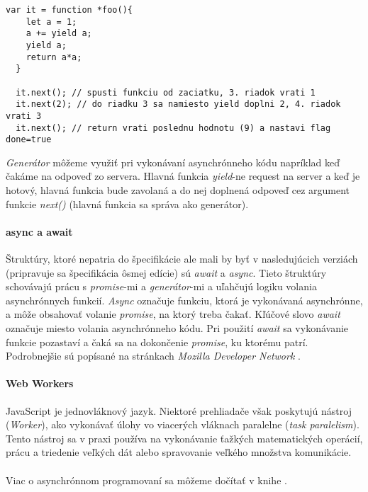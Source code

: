 \begin{lstlisting}[caption=Generátor, label={lst:generator}]
  var it = function *foo(){
    let a = 1;
    a += yield a;
    yield a;
    return a*a;
  }

  it.next(); // spusti funkciu od zaciatku, 3. riadok vrati 1
  it.next(2); // do riadku 3 sa namiesto yield doplni 2, 4. riadok vrati 3
  it.next(); // return vrati poslednu hodnotu (9) a nastavi flag done=true
\end{lstlisting}

\emph{Generátor} môžeme využiť pri vykonávaní asynchrónneho kódu napríklad keď čakáme na odpoveď zo servera. Hlavná funkcia \emph{yield}-ne request na server a keď je hotový, hlavná funkcia bude zavolaná a do nej doplnená odpoveď cez argument funkcie \emph{next()} (hlavná funkcia sa správa ako generátor).

\paragraph{async a await}
Štruktúry, ktoré nepatria do špecifikácie \JS{} ale mali by byť v nasledujúcich verziách (pripravuje sa špecifikácia ôsmej edície) sú \emph{await} a \emph{async}. 
Tieto štruktúry schovávajú prácu s \emph{promise}-mi a \emph{generátor}-mi a uľahčujú logiku volania asynchrónnych funkcií.
\emph{Async} označuje funkciu, ktorá je vykonávaná asynchrónne, a môže obsahovať volanie \emph{promise}, na ktorý treba čakať.
Kľúčové slovo \emph{await} označuje miesto volania asynchrónneho kódu. Pri použití \emph{await} sa vykonávanie funkcie pozastaví a čaká sa na dokončenie \emph{promise}, ku ktorému patrí.
Podrobnejšie sú popísané na stránkach \emph{Mozilla Developer Network} \cite{async, await}.

\paragraph{Web Workers}
JavaScript je jednovláknový jazyk. Niektoré prehliadače však poskytujú nástroj (\emph{Worker}), ako vykonávať úlohy vo viacerých vláknach paralelne (\emph{task paralelism}). Tento nástroj sa v praxi používa na vykonávanie ťažkých matematických operácií, prácu a triedenie veľkých dát alebo spravovanie veľkého množstva komunikácie.

\paragraph{}
\NEW{}
Viac o asynchrónnom programovaní sa môžeme dočítať v knihe \cite[Async \& Performance]{youDontKnowJS5}.

